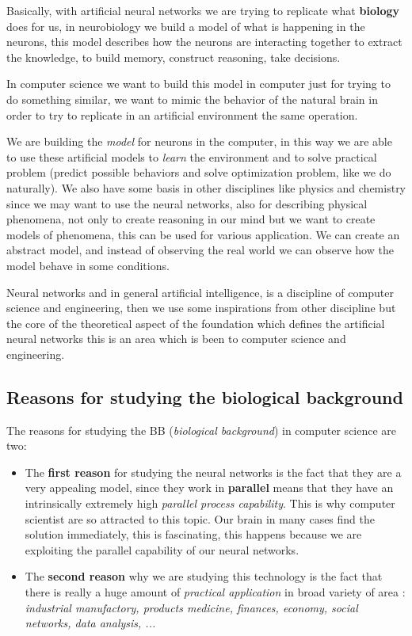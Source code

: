\documentclass{article}
\begin{document}
Basically, with artificial neural networks we are trying to replicate what \textbf{biology} does for us, in neurobiology
we build a model of what is happening in the neurons, this model describes how the neurons are
interacting together to extract the knowledge, to build memory, construct reasoning, take decisions.

In computer science we want to build this model in computer just for trying to do something similar, we want to mimic the
behavior of the natural brain in order to try to replicate in an artificial environment the same operation.

We are building the \textit{model} for neurons in the computer, in this way we are able to use these
artificial models to \textit{learn} the environment and to solve practical problem (predict possible behaviors
and solve optimization problem, like we do naturally). We also have some basis in other disciplines like
physics and chemistry since we may want to use the neural networks, also for describing physical phenomena,
not only to create reasoning in our mind but we want to create models of phenomena, this can be used for various application.
We can create an abstract model, and instead of observing the real world we can observe how the model behave in some conditions.

Neural networks and in general artificial intelligence, is a discipline of computer science and
engineering, then we use some inspirations from other discipline but the core of the theoretical aspect
of the foundation which defines the artificial neural networks this is an area which is been to computer science and engineering.
\subsection{Reasons for studying the biological background}
The reasons for studying the BB (\textit{biological background}) in computer science are two:
\begin{itemize}
    \item The \textbf{first reason} for studying the neural networks is the fact that they are a very appealing model,
          since they work in \textbf{parallel} means that they have an intrinsically extremely high \textit{parallel process capability}.
          This is why computer scientist are so attracted to this topic. Our brain in many cases find the solution immediately, this
          is fascinating, this happens because we are exploiting the parallel capability of our neural networks.
    \item The \textbf{second reason} why we are studying this technology is the fact that there is really a huge amount of \textit{practical
              application} in broad variety of area : \textit{industrial manufactory, products medicine, finances, economy, social networks, data analysis, ...}
\end{itemize}
\end{document}
